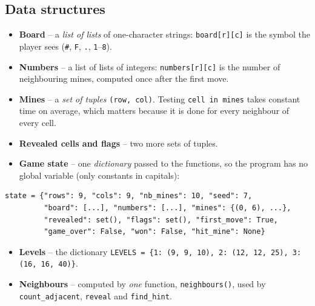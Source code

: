 \documentclass[11pt,a4paper]{article}
\newcommand{\code}[1]{\texttt{#1}}
\begin{document}
\subsection{Data structures}
\begin{itemize}
\item \textbf{Board} -- a \emph{list of lists} of one-character strings: \code{board[r][c]} is the
  symbol the player sees (\code{\#}, \code{F}, \code{.}, \code{1}--\code{8}).
\item \textbf{Numbers} -- a list of lists of integers: \code{numbers[r][c]} is the number of
  neighbouring mines, computed once after the first move.
\item \textbf{Mines} -- a \emph{set of tuples} \code{(row, col)}. Testing \code{cell in mines} takes
  constant time on average, which matters because it is done for every neighbour of every cell.
\item \textbf{Revealed cells and flags} -- two more sets of tuples.
\item \textbf{Game state} -- one \emph{dictionary} passed to the functions, so the program has no
  global variable (only constants in capitals):
\end{itemize}
\begin{lstlisting}
state = {"rows": 9, "cols": 9, "nb_mines": 10, "seed": 7,
         "board": [...], "numbers": [...], "mines": {(0, 6), ...},
         "revealed": set(), "flags": set(), "first_move": True,
         "game_over": False, "won": False, "hit_mine": None}
\end{lstlisting}
\begin{itemize}
\item \textbf{Levels} -- the dictionary \code{LEVELS = \{1: (9, 9, 10), 2: (12, 12, 25), 3: (16, 16, 40)\}}.
\item \textbf{Neighbours} -- computed by \emph{one} function, \code{neighbours()}, used by
  \code{count\_adjacent}, \code{reveal} and \code{find\_hint}.
\end{itemize}
\end{document}
